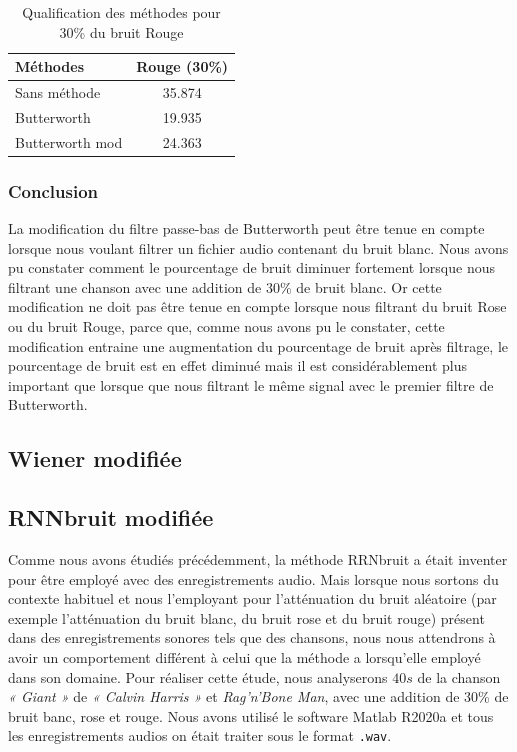 \documentclass[conference,onecolumn]{IEEEtran}
\begin{document}
\begin{table}[hbt!]
    \centering
    \begin{tabular}{ l  c }
    \textbf{Méthodes} & \textbf{Rouge (30\%)} \\
    \hline
    Sans méthode &  35.874\\
    Butterworth &  19.935\\
    Butterworth mod &  24.363\\
    \end{tabular}
    \caption{Qualification des méthodes pour 30\% du bruit Rouge}
    \label{table:t9}
\end{table}

\subsubsection{Conclusion}
La modification du filtre passe-bas de Butterworth peut être tenue en compte lorsque nous voulant filtrer un fichier audio contenant du bruit blanc. Nous avons pu constater comment le pourcentage de bruit diminuer fortement lorsque nous filtrant une chanson avec une addition de 30\% de bruit blanc. Or cette modification ne doit pas être tenue en compte lorsque nous filtrant du bruit Rose ou du bruit Rouge, parce que, comme nous avons pu le constater, cette modification entraine une augmentation du pourcentage de bruit après filtrage, le pourcentage de bruit est en effet diminué mais il est considérablement plus important que lorsque que nous filtrant le même signal avec le premier filtre de Butterworth.

\subsection{\textbf{Wiener modifiée}}

\subsection{\textbf{RNNbruit modifiée}}
Comme nous avons étudiés précédemment, la méthode RRNbruit a était inventer pour être employé avec des enregistrements audio. Mais lorsque nous sortons du contexte habituel et nous l’employant pour l’atténuation du bruit aléatoire (par exemple l’atténuation du bruit blanc, du bruit rose et du bruit rouge) présent dans des enregistrements sonores tels que des chansons, nous nous attendrons à avoir un comportement différent à celui que la méthode a lorsqu’elle employé dans son domaine. Pour réaliser cette étude, nous analyserons $40s$ de la chanson \textit{« Giant »} de \textit{« Calvin Harris »} et \textit{Rag'n'Bone Man}, avec une addition de 30\% de bruit banc, rose et rouge. Nous avons utilisé le software Matlab R2020a et tous les enregistrements audios on était traiter sous le format \texttt{.wav}.
\end{document}
